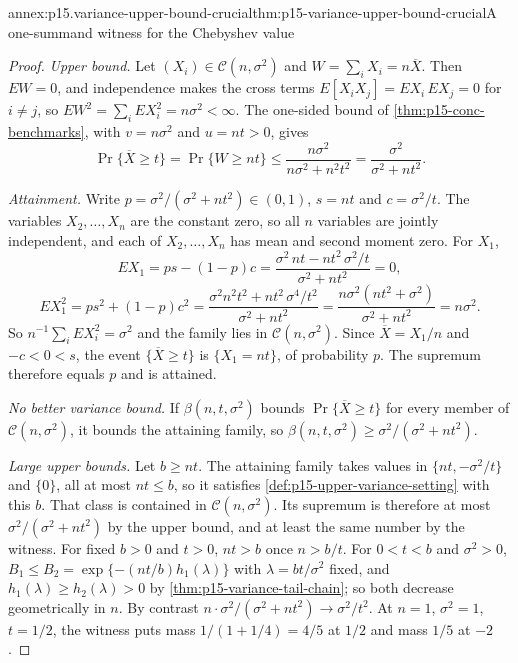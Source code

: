 \begin{annexitem}{annex:p15.variance-upper-bound-crucial}{thm:p15-variance-upper-bound-crucial}{A one-summand witness for the Chebyshev value}
\begin{proof}
\emph{Upper bound.} Let \((X_i)\in\mathcal C(n,\sigma^2)\) and
\(W=\sum_iX_i=n\overline X\). Then \(EW=0\), and independence makes the
cross terms \(E[X_iX_j]=EX_i\,EX_j=0\) for \(i\neq j\), so
\(EW^2=\sum_iEX_i^2=n\sigma^2<\infty\). The one-sided bound of
\cref{thm:p15-conc-benchmarks}, with \(v=n\sigma^2\) and \(u=nt>0\), gives
\[
 \Pr\{\overline X\geq t\}=\Pr\{W\geq nt\}
 \leq\frac{n\sigma^2}{n\sigma^2+n^2t^2}
 =\frac{\sigma^2}{\sigma^2+nt^2}.
\]

\emph{Attainment.} Write \(p=\sigma^2/(\sigma^2+nt^2)\in(0,1)\),
\(s=nt\) and \(c=\sigma^2/t\). The variables \(X_2,\ldots,X_n\) are the
constant zero, so all \(n\) variables are jointly independent, and each
of \(X_2,\ldots,X_n\) has mean and second moment zero. For \(X_1\),
\[
 EX_1=ps-(1-p)c
 =\frac{\sigma^2\,nt-nt^2\,\sigma^2/t}{\sigma^2+nt^2}=0,
\]
\[
 EX_1^2=ps^2+(1-p)c^2
 =\frac{\sigma^2n^2t^2+nt^2\,\sigma^4/t^2}{\sigma^2+nt^2}
 =\frac{n\sigma^2(nt^2+\sigma^2)}{\sigma^2+nt^2}=n\sigma^2 .
\]
So \(n^{-1}\sum_iEX_i^2=\sigma^2\) and the family lies in
\(\mathcal C(n,\sigma^2)\). Since \(\overline X=X_1/n\) and
\(-c<0<s\), the event \(\{\overline X\geq t\}\) is \(\{X_1=nt\}\), of
probability \(p\). The supremum therefore equals \(p\) and is attained.

\emph{No better variance bound.} If \(\beta(n,t,\sigma^2)\) bounds
\(\Pr\{\overline X\geq t\}\) for every member of
\(\mathcal C(n,\sigma^2)\), it bounds the attaining family, so
\(\beta(n,t,\sigma^2)\geq\sigma^2/(\sigma^2+nt^2)\).

\emph{Large upper bounds.} Let \(b\geq nt\). The attaining family takes
values in \(\{nt,-\sigma^2/t\}\) and \(\{0\}\), all at most \(nt\leq b\),
so it satisfies \cref{def:p15-upper-variance-setting} with this \(b\).
That class is contained in \(\mathcal C(n,\sigma^2)\). Its supremum is
therefore at most \(\sigma^2/(\sigma^2+nt^2)\) by the upper bound, and at
least the same number by the witness. For fixed \(b>0\) and \(t>0\),
\(nt>b\) once \(n>b/t\). For \(0<t<b\) and \(\sigma^2>0\),
\(B_1\leq B_2=\exp\{-(nt/b)h_1(\lambda)\}\) with \(\lambda=bt/\sigma^2\)
fixed, and \(h_1(\lambda)\geq h_2(\lambda)>0\) by
\cref{thm:p15-variance-tail-chain}; so both decrease geometrically in
\(n\). By contrast \(n\cdot\sigma^2/(\sigma^2+nt^2)\to\sigma^2/t^2\).
At \(n=1\), \(\sigma^2=1\), \(t=1/2\), the witness puts mass
\(1/(1+1/4)=4/5\) at \(1/2\) and mass \(1/5\) at \(-2\).
\end{proof}
\end{annexitem}

